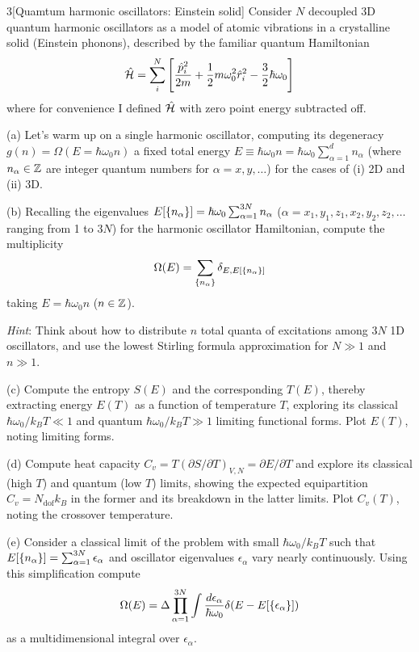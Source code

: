 \documentclass[12pt]{article}
\begin{document}
\newpage
\begin{problem}{3}[Quamtum harmonic oscillators: Einstein solid]
Consider $N$ decoupled 3D quantum harmonic oscillators as a model of atomic
vibrations in a crystalline solid (Einstein phonons), described by the familiar
quantum Hamiltonian
\begin{equation}
    \hat{\mathcal{H}}=\sum_{i}^N\qty[\frac{\hat{p}_i^2}{2m}+\frac12m\omega_0^2\hat{r}_i^2-\frac32\hbar\omega_0] 
\end{equation}
where for convenience I defined $\hat{\mathcal{H}}$ with zero point energy subtracted off.

(a) Let's warm up on a single harmonic oscillator, computing its degeneracy
$g(n)=\Omega(E=\hbar\omega_0n)$ a fixed total energy
$E\equiv\hbar\omega_0n=\hbar\omega_0\sum_{\alpha=1}^dn_\alpha$ (where
$n_\alpha\in\mathbb{Z}$ are integer quantum numbers for $\alpha=x,y,\hdots$) for the
cases of (i) 2D and (ii) 3D.

(b) Recalling the eigenvalues
$E[\qty{n_\alpha}]=\hbar\omega_0\sum_{\alpha=1}^{3N}n_\alpha$
($\alpha=x_1,y_1,z_1,x_2,y_2,z_2,\hdots$ ranging from 1 to $3N$) for the
harmonic oscillator Hamiltonian, compute the multiplicity
\begin{equation}
    \Omega(E)=\sum_{\qty{n_\alpha}}\delta_{E,E[\qty{n_\alpha}]} 
\end{equation}
taking $E=\hbar\omega_0n$ ($n\in\mathbb{Z}$).

\textit{Hint}: Think about how to distribute $n$ total quanta of excitations
among $3N$ 1D oscillators, and use the lowest Stirling formula approximation for
$N\gg 1$ and $n\gg 1$.

(c) Compute the entropy $S(E)$ and the corresponding $T(E)$, thereby extracting
energy $E(T)$ as a function of temperature $T$, exploring its classical
$\hbar\omega_0/k_BT\ll1$ and quantum $\hbar\omega_0/k_BT\gg1$ limiting
functional forms. Plot $E(T)$, noting limiting forms.

(d) Compute heat capacity
$C_v=T(\partial S/\partial T)_{V,N}=\partial E/\partial T$ and explore its 
classical (high $T$) and quantum (low $T$) limits, showing
the expected equipartition $C_v=N_\text{dof}k_B$ in the former and its 
breakdown in the latter limits. Plot $C_v(T)$, noting the crossover temperature.

(e) Consider a classical limit of the problem with small $\hbar\omega_0/k_BT$
such that $E[\qty{n_\alpha}]=\sum_{\alpha=1}^{3N}\epsilon_\alpha$ and oscillator
eigenvalues $\epsilon_\alpha$ vary nearly continuously. Using this
simplification compute
\begin{equation}
    \Omega(E)=\Delta\prod_{\alpha=1}^{3N}\int\frac{d\epsilon_\alpha}{\hbar\omega_0}
    \delta(E-E[\qty{\epsilon_\alpha}]) 
\end{equation}
as a multidimensional integral over $\epsilon_\alpha$.


\end{problem}
\end{document}
